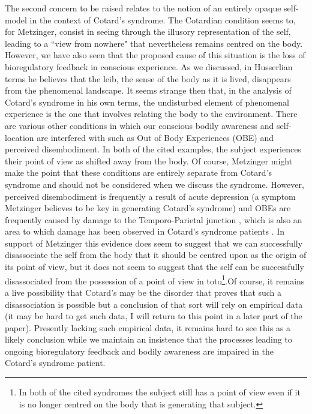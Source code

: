 The second concern to be raised relates to the notion of an entirely opaque self-model in the context of Cotard's syndrome. The Cotardian condition seems to, for Metzinger, consist in seeing through the illusory representation of the self, leading to a ``view from nowhere" \cite[p. 88]{grush2000} that nevertheless remains centred on the body. However, we have also seen that the proposed cause of this situation is the loss of bioregulatory feedback in conscious experience. As we discussed, in Husserlian terms he believes that the leib, the sense of the body as it is lived, disappears from the phenomenal landscape. It seems strange then that, in the analysis of Cotard's syndrome in his own terms, the undisturbed element of phenomenal experience is the one that involves relating the body to the environment. There are various other conditions in which our conscious bodily awareness and self-location are interfered with such as Out of Body Experiences (OBE) and perceived disembodiment. In both of the cited examples, the subject experiences their point of view as shifted away from the body. Of course, Metzinger might make the point that these conditions are entirely separate from Cotard's syndrome and should not be considered when we discuss the syndrome. However, perceived disembodiment is frequently a result of acute depression (a symptom Metzinger believes to be key in generating Cotard's syndrome) and OBEs are frequently caused by damage to the Temporo-Parietal junction \cite{blanke2005}, which is also an area to which damage has been observed in Cotard's syndrome patients \cite{enoch1991,young1995}. In support of Metzinger this evidence does seem to suggest that we can successfully disassociate the self from the body that it should be centred upon as the origin of its point of view, but it does not seem to suggest that the self can be successfully disassociated from the possession of a point of view in toto\footnote{In both of the cited syndromes the subject still has a point of view even if it is no longer centred on the body that is generating that subject.}.Of course, it remains a live possibility that Cotard's may be the disorder that proves that such a disassociation is possible but a conclusion of that sort will rely on empirical data (it may be hard to get such data, I will return to this point in a later part of the paper). Presently lacking such empirical data, it remains hard to see this as a likely conclusion while we maintain an insistence that the processes leading to ongoing bioregulatory feedback and bodily awareness are impaired in the Cotard's syndrome patient.

